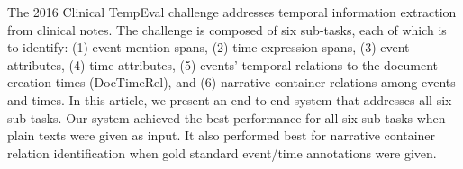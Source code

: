 The 2016 Clinical TempEval challenge addresses temporal information extraction from clinical notes. The challenge is composed of six sub-tasks, each of which is to identify: (1) event mention spans, (2) time expression spans, (3) event attributes, (4) time attributes, (5) events' temporal relations to the document creation times (DocTimeRel), and (6) narrative container relations among events and times. In this article, we present an end-to-end system that addresses all six sub-tasks. Our system achieved the best performance for all six sub-tasks when plain texts were given as input. It also performed best for narrative container relation identification when gold standard event/time annotations were given.

